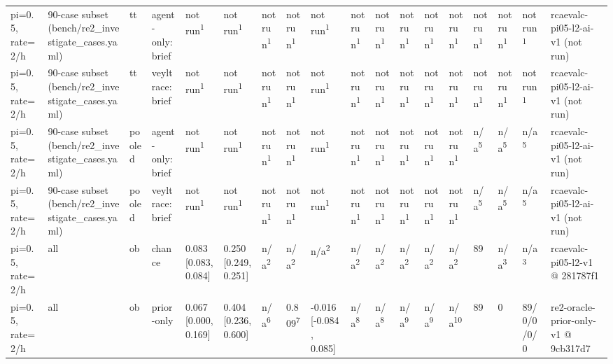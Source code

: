 \begin{table}[t]
\begin{tabular}{llllllllllllllllll}
pi=0.5, rate=2/h & 90-case subset (bench/re2\_investigate\_cases.yaml) & tt & agent-only:brief & not run\textsuperscript{1} & not run\textsuperscript{1} & not run\textsuperscript{1} & not run\textsuperscript{1} & not run\textsuperscript{1} & not run\textsuperscript{1} & not run\textsuperscript{1} & not run\textsuperscript{1} & not run\textsuperscript{1} & not run\textsuperscript{1} & not run\textsuperscript{1} & not run\textsuperscript{1} & not run\textsuperscript{1} & rcaevalc-pi05-l2-ai-v1 (not run) \\
pi=0.5, rate=2/h & 90-case subset (bench/re2\_investigate\_cases.yaml) & tt & veyltrace:brief & not run\textsuperscript{1} & not run\textsuperscript{1} & not run\textsuperscript{1} & not run\textsuperscript{1} & not run\textsuperscript{1} & not run\textsuperscript{1} & not run\textsuperscript{1} & not run\textsuperscript{1} & not run\textsuperscript{1} & not run\textsuperscript{1} & not run\textsuperscript{1} & not run\textsuperscript{1} & not run\textsuperscript{1} & rcaevalc-pi05-l2-ai-v1 (not run) \\
pi=0.5, rate=2/h & 90-case subset (bench/re2\_investigate\_cases.yaml) & pooled & agent-only:brief & not run\textsuperscript{1} & not run\textsuperscript{1} & not run\textsuperscript{1} & not run\textsuperscript{1} & not run\textsuperscript{1} & not run\textsuperscript{1} & not run\textsuperscript{1} & not run\textsuperscript{1} & not run\textsuperscript{1} & not run\textsuperscript{1} & n/a\textsuperscript{5} & n/a\textsuperscript{5} & n/a\textsuperscript{5} & rcaevalc-pi05-l2-ai-v1 (not run) \\
pi=0.5, rate=2/h & 90-case subset (bench/re2\_investigate\_cases.yaml) & pooled & veyltrace:brief & not run\textsuperscript{1} & not run\textsuperscript{1} & not run\textsuperscript{1} & not run\textsuperscript{1} & not run\textsuperscript{1} & not run\textsuperscript{1} & not run\textsuperscript{1} & not run\textsuperscript{1} & not run\textsuperscript{1} & not run\textsuperscript{1} & n/a\textsuperscript{5} & n/a\textsuperscript{5} & n/a\textsuperscript{5} & rcaevalc-pi05-l2-ai-v1 (not run) \\
pi=0.5, rate=2/h & all & ob & chance & 0.083 [0.083, 0.084] & 0.250 [0.249, 0.251] & n/a\textsuperscript{2} & n/a\textsuperscript{2} & n/a\textsuperscript{2} & n/a\textsuperscript{2} & n/a\textsuperscript{2} & n/a\textsuperscript{2} & n/a\textsuperscript{2} & n/a\textsuperscript{2} & 89 & n/a\textsuperscript{3} & n/a\textsuperscript{3} & rcaevalc-pi05-l2-v1 @ 281787f1 \\
pi=0.5, rate=2/h & all & ob & prior-only & 0.067 [0.000, 0.169] & 0.404 [0.236, 0.600] & n/a\textsuperscript{6} & 0.809\textsuperscript{7} & -0.016 [-0.084, 0.085] & n/a\textsuperscript{8} & n/a\textsuperscript{8} & n/a\textsuperscript{9} & n/a\textsuperscript{9} & n/a\textsuperscript{10} & 89 & 0 & 89/0/0/0/0 & re2-oracle-prior-only-v1 @ 9cb317d7 \\

\end{tabular}
\end{table}
